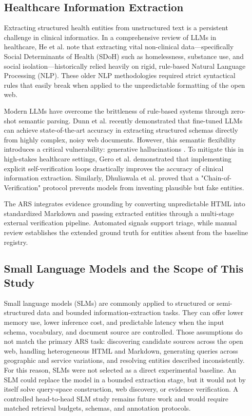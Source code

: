 \documentclass[12pt,oneside]{report}
\begin{document}
\subsection{Healthcare Information Extraction}
Extracting structured health entities from unstructured text is a persistent challenge in clinical informatics. In a comprehensive review of LLMs in healthcare, He et al. \cite{28} note that extracting vital non-clinical data—specifically Social Determinants of Health (SDoH) such as homelessness, substance use, and social isolation—historically relied heavily on rigid, rule-based Natural Language Processing (NLP). These older NLP methodologies required strict syntactical rules that easily break when applied to the unpredictable formatting of the open web.

Modern LLMs have overcome the brittleness of rule-based systems through zero-shot semantic parsing. Dunn et al. \cite{2} recently demonstrated that fine-tuned LLMs can achieve state-of-the-art accuracy in extracting structured schemas directly from highly complex, noisy web documents. However, this semantic flexibility introduces a critical vulnerability: generative hallucinations \cite{40}. To mitigate this in high-stakes healthcare settings, Gero et al. \cite{42} demonstrated that implementing explicit self-verification loops drastically improves the accuracy of clinical information extraction. Similarly, Dhuliawala et al. \cite{43} proved that a "Chain-of-Verification" protocol prevents models from inventing plausible but fake entities. 

The ARS integrates evidence grounding by converting unpredictable HTML into standardized Markdown and passing extracted entities through a multi-stage external verification pipeline. Automated signals support triage, while manual review establishes the extended ground truth for entities absent from the baseline registry.

\subsection{Small Language Models and the Scope of This Study}
Small language models (SLMs) are commonly applied to structured or semi-structured data and bounded information-extraction tasks. They can offer lower memory use, lower inference cost, and predictable latency when the input schema, vocabulary, and document source are controlled. Those assumptions do not match the primary ARS task: discovering candidate sources across the open web, handling heterogeneous HTML and Markdown, generating queries across geographic and service variations, and resolving entities described inconsistently. For this reason, SLMs were not selected as a direct experimental baseline. An SLM could replace the model in a bounded extraction stage, but it would not by itself solve query-space construction, web discovery, or evidence verification. A controlled head-to-head SLM study remains future work and would require matched retrieval budgets, schemas, and annotation protocols.
\end{document}
